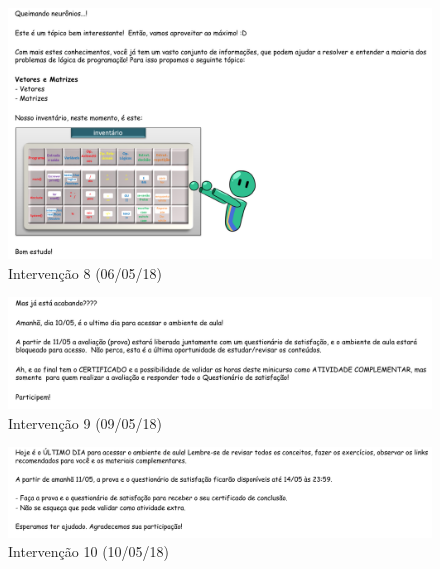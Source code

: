 \begin{figure}[htb]
  \caption{\label{fig:intervencao-8}Intervenção 8 (06/05/18)}
  \begin{center}
      \includegraphics[scale=0.6]{./Figuras/intervencao-8.png}
  \end{center}
\end{figure}

\begin{figure}[htb]
  \caption{\label{fig:intervencao-9}Intervenção 9 (09/05/18)}
  \begin{center}
      \includegraphics[scale=0.6]{./Figuras/intervencao-9.png}
  \end{center}
\end{figure}

\begin{figure}[htb]
  \caption{\label{fig:intervencao-10}Intervenção 10 (10/05/18)}
  \begin{center}
      \includegraphics[scale=0.6]{./Figuras/intervencao-10.png}
  \end{center}
\end{figure}

